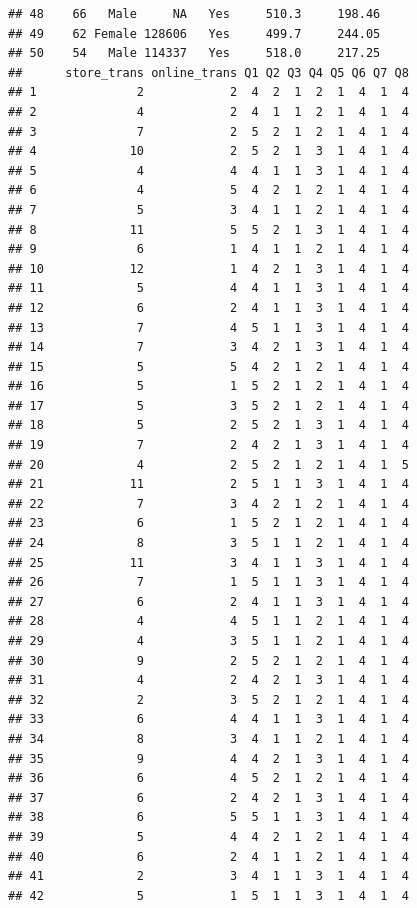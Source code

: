 \documentclass[12pt,]{krantz}
\theoremstyle{definition}
\theoremstyle{definition}
\theoremstyle{definition}
\theoremstyle{remark}
\begin{document}
\begin{verbatim}
## 48    66   Male     NA   Yes     510.3     198.46
## 49    62 Female 128606   Yes     499.7     244.05
## 50    54   Male 114337   Yes     518.0     217.25
##      store_trans online_trans Q1 Q2 Q3 Q4 Q5 Q6 Q7 Q8
## 1              2            2  4  2  1  2  1  4  1  4
## 2              4            2  4  1  1  2  1  4  1  4
## 3              7            2  5  2  1  2  1  4  1  4
## 4             10            2  5  2  1  3  1  4  1  4
## 5              4            4  4  1  1  3  1  4  1  4
## 6              4            5  4  2  1  2  1  4  1  4
## 7              5            3  4  1  1  2  1  4  1  4
## 8             11            5  5  2  1  3  1  4  1  4
## 9              6            1  4  1  1  2  1  4  1  4
## 10            12            1  4  2  1  3  1  4  1  4
## 11             5            4  4  1  1  3  1  4  1  4
## 12             6            2  4  1  1  3  1  4  1  4
## 13             7            4  5  1  1  3  1  4  1  4
## 14             7            3  4  2  1  3  1  4  1  4
## 15             5            5  4  2  1  2  1  4  1  4
## 16             5            1  5  2  1  2  1  4  1  4
## 17             5            3  5  2  1  2  1  4  1  4
## 18             5            2  5  2  1  3  1  4  1  4
## 19             7            2  4  2  1  3  1  4  1  4
## 20             4            2  5  2  1  2  1  4  1  5
## 21            11            2  5  1  1  3  1  4  1  4
## 22             7            3  4  2  1  2  1  4  1  4
## 23             6            1  5  2  1  2  1  4  1  4
## 24             8            3  5  1  1  2  1  4  1  4
## 25            11            3  4  1  1  3  1  4  1  4
## 26             7            1  5  1  1  3  1  4  1  4
## 27             6            2  4  1  1  3  1  4  1  4
## 28             4            4  5  1  1  2  1  4  1  4
## 29             4            3  5  1  1  2  1  4  1  4
## 30             9            2  5  2  1  2  1  4  1  4
## 31             4            2  4  2  1  3  1  4  1  4
## 32             2            3  5  2  1  2  1  4  1  4
## 33             6            4  4  1  1  3  1  4  1  4
## 34             8            3  4  1  1  2  1  4  1  4
## 35             9            4  4  2  1  3  1  4  1  4
## 36             6            4  5  2  1  2  1  4  1  4
## 37             6            2  4  2  1  3  1  4  1  4
## 38             6            5  5  1  1  3  1  4  1  4
## 39             5            4  4  2  1  2  1  4  1  4
## 40             6            2  4  1  1  2  1  4  1  4
## 41             2            3  4  1  1  3  1  4  1  4
## 42             5            1  5  1  1  3  1  4  1  4

\end{verbatim}
\end{document}
